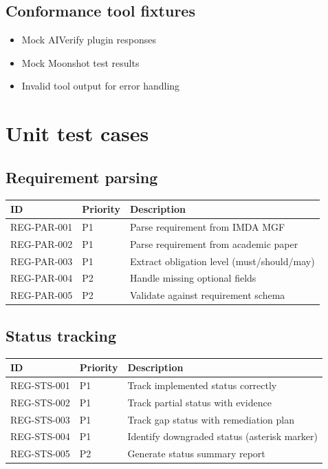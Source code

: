 \subsection{Conformance tool fixtures}

\begin{itemize}
  \item Mock AIVerify plugin responses
  \item Mock Moonshot test results
  \item Invalid tool output for error handling
\end{itemize}

\section{Unit test cases}

\subsection{Requirement parsing}

\begin{tabularx}{\linewidth}{@{}l l X@{}}
\toprule
\textbf{ID} & \textbf{Priority} & \textbf{Description} \\ \midrule
REG-PAR-001 & P1 & Parse requirement from IMDA MGF \\
REG-PAR-002 & P1 & Parse requirement from academic paper \\
REG-PAR-003 & P1 & Extract obligation level (must/should/may) \\
REG-PAR-004 & P2 & Handle missing optional fields \\
REG-PAR-005 & P2 & Validate against requirement schema \\
\bottomrule
\end{tabularx}

\subsection{Status tracking}

\begin{tabularx}{\linewidth}{@{}l l X@{}}
\toprule
\textbf{ID} & \textbf{Priority} & \textbf{Description} \\ \midrule
REG-STS-001 & P1 & Track implemented status correctly \\
REG-STS-002 & P1 & Track partial status with evidence \\
REG-STS-003 & P1 & Track gap status with remediation plan \\
REG-STS-004 & P1 & Identify downgraded status (asterisk marker) \\
REG-STS-005 & P2 & Generate status summary report \\
\bottomrule
\end{tabularx}

